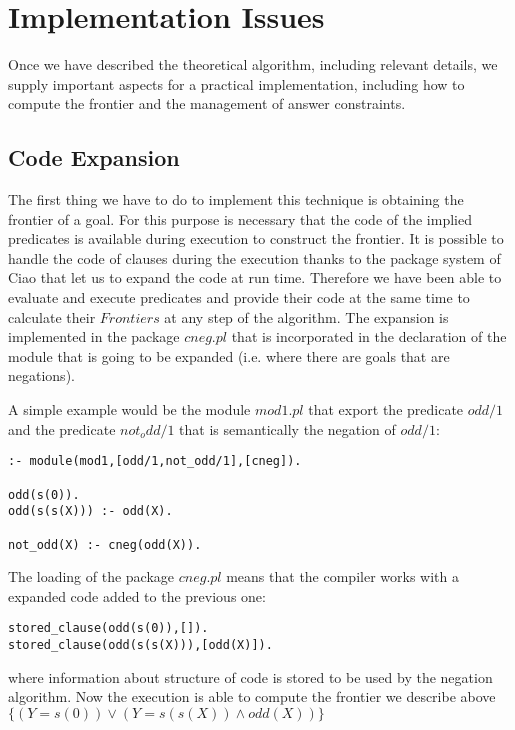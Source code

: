 \documentclass{llncs}
\begin{document}
    


\section{Implementation Issues}
\label{implementation}

Once we have described the theoretical algorithm, including relevant
details, we supply important aspects for a practical implementation,
including how to compute the frontier and the management of answer
constraints.


\subsection{Code Expansion}
\label{expansion}

The first thing we have to do to implement this technique is obtaining
the frontier of a goal. For this purpose is necessary that the code of
the implied predicates is available during execution to construct the
frontier. It is possible to handle the code of clauses during the
execution thanks to the package system of Ciao
\cite{ciao-modules-cl2000} that let us to expand the code at run time.
Therefore we have been able to evaluate and execute predicates and
provide their code at the same time to calculate their $Frontiers$ at
any step of the algorithm. The expansion is implemented in the package
$cneg.pl$ that is incorporated in the declaration of the module that
is going to be expanded (i.e. where there are goals that are
negations).

A simple example would be the module $mod1.pl$ that export the
predicate $odd/1$ and the predicate $not_odd/1$ that is semantically
the negation of $odd/1$:
\begin{verbatim}
:- module(mod1,[odd/1,not_odd/1],[cneg]).

odd(s(0)).
odd(s(s(X))) :- odd(X).

not_odd(X) :- cneg(odd(X)).
\end{verbatim}
The loading of the package $cneg.pl$ means 
that the compiler works with a expanded code added to the previous one:
\begin{verbatim}
stored_clause(odd(s(0)),[]).
stored_clause(odd(s(s(X))),[odd(X)]).
\end{verbatim}
where information about structure of code is stored to be used by the
negation algorithm. Now the execution is able to compute the frontier
we describe above $\{ ( Y=s(0) ) \vee ( Y=s(s(X)) \wedge odd(X) ) \}$
\end{document}
